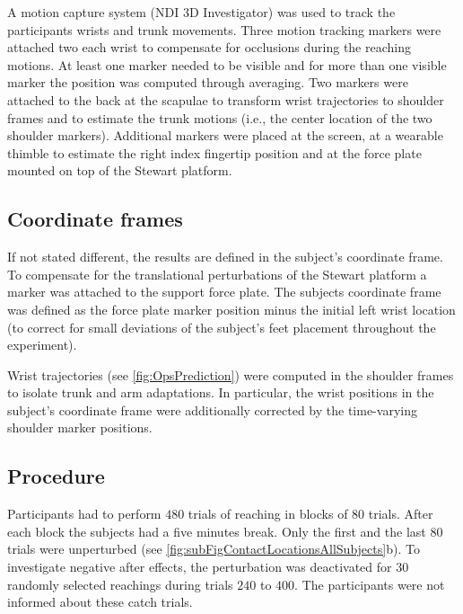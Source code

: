 A motion capture system (NDI 3D Investigator) was used to track the participants 
wrists and trunk movements. Three motion tracking markers were attached two each wrist to 
compensate for occlusions during the reaching motions. At least one marker 
needed to be visible and for more than one visible marker the position was 
computed through averaging. Two markers were attached to the back at the 
scapulae to transform wrist trajectories to shoulder frames and to estimate the 
trunk motions (i.e., the center location of the two shoulder markers). 
Additional markers were placed at the screen, at a wearable thimble to estimate 
the right index fingertip position and at the force plate mounted on top of the 
Stewart platform.

\subsection*{Coordinate frames}

If not stated different, the results are defined in the subject's coordinate
frame. To compensate for the translational perturbations of the Stewart platform
a marker was attached to the support force plate. The subjects coordinate frame
was defined as the force plate marker position minus the initial left wrist
location (to correct for small deviations of the subject's feet placement
throughout the experiment). 

Wrist trajectories (see \FigureAbbrP \ref{fig:OpsPrediction}) were computed in the shoulder frames to isolate
trunk and arm adaptations. In particular, the wrist positions in the subject's
coordinate frame were additionally corrected by the time-varying shoulder marker positions.  

\subsection*{Procedure}

Participants had to perform $480$ trials of reaching in blocks of $80$ trials.
After each block the subjects had a five minutes break. Only the first and the
last $80$ trials were unperturbed (see \FigureAbbrP 
\ref{fig:subFigContactLocationsAllSubjects}b). To investigate
negative after effects, the perturbation was deactivated for $30$ randomly selected reachings  
during trials $240$ to $400$. The participants were not informed about these
catch trials. 

